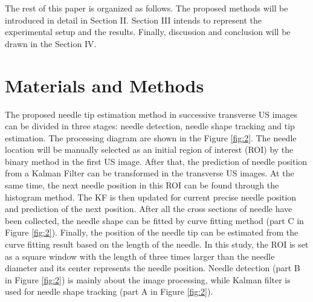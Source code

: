 \documentclass[journal,article,submit,moreauthors,pdftex]{Definitions/mdpi}
\begin{document}
The rest of this paper is organized as follows. The proposed methods will be introduced in detail in Section II. Section III intends to represent the experimental setup and the results. Finally, discussion and conclusion will be drawn in the Section IV.



\section{Materials and Methods}

The proposed needle tip estimation method in successive transverse US images can be divided in three stages: needle detection, needle shape tracking and tip estimation. The processing diagram are shown in the Figure \ref{fig:2}. The needle location will be manually selected as an initial region of interest (ROI) by the binary method in the first US image. After that, the prediction of needle position from a Kalman Filter can be transformed in the transverse US images. At the same time, the next needle position in this ROI can be found through the histogram method. The KF is then updated for current precise needle position and prediction of the next position. After all the cross sections of needle have been collected, the needle shape can be fitted by curve fitting method (part C in Figure \ref{fig:2}). Finally, the position of the needle tip can be estimated from the curve fitting result based on the length of the needle. In this study, the ROI is set as a square window with the length of three times larger than the needle diameter and its center represents the needle position. Needle detection (part B in Figure \ref{fig:2}) is mainly about the image processing, while Kalman filter is used for needle shape tracking (part A in Figure \ref{fig:2}).
\end{document}

